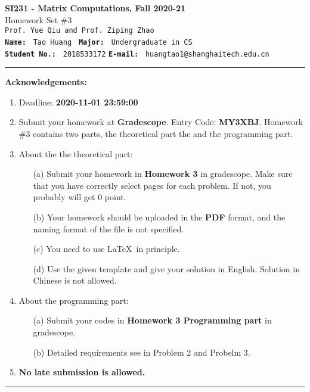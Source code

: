 \documentclass[english,onecolumn]{IEEEtran}
\begin{document}
\begin{center}
	\textbf{\LARGE{SI231 - Matrix Computations, Fall 2020-21}}\\
	{\Large Homework Set \#3}\\
	\texttt{Prof. Yue Qiu and Prof. Ziping Zhao}\\
	\texttt{\textbf{Name:}}   	\texttt{ Tao Huang }  		\hspace{1bp}
	\texttt{\textbf{Major:}}  	\texttt{ Undergraduate in CS } 	\\
	\texttt{\textbf{Student No.:}} 	\texttt{ 2018533172}     \hspace{1bp}
	\texttt{\textbf{E-mail:}} 	\texttt{ huangtao1@shanghaitech.edu.cn}
\par\end{center}



\noindent
\rule{\linewidth}{0.4pt}
{\bf {\large Acknowledgements:}}
\begin{enumerate}
    \item Deadline: \textbf{2020-11-01 23:59:00}
    \item Submit your homework at \textbf{Gradescope}. Entry Code: \textbf{MY3XBJ}. 
    Homework \#3 contains two parts, the theoretical part the and the programming part.
    \item About the the theoretical part:
    \begin{enumerate}
            \item[(a)] Submit your homework in \textbf{Homework 3} in gradescope. Make sure that you have correctly select pages for each problem. If not, you probably will get 0 point.
            \item[(b)] Your homework should be uploaded in the \textbf{PDF} format, and the naming format of the file is not specified.
            \item[(c)] You need to use \LaTeX $\,$ in principle.
            \item[(d)] Use the given template and give your solution in English. Solution in Chinese is not allowed. 
        \end{enumerate}
  \item About the programming part:
  \begin{enumerate}
      \item[(a)] Submit your codes in \textbf{Homework 3 Programming part} in gradescope.
      \item[(b)] Detailed requirements see in Problem 2 and Probelm 3.
  \end{enumerate}
  \item \textbf{No late submission is allowed.}
\end{enumerate}
\rule{\linewidth}{0.4pt}
\newpage 
\end{document}
